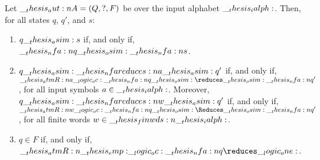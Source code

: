 \begin{theorem}
  Let $\__thesis_aut:n {A} = (Q, ?, F)$ be  over the input alphabet $\__thesis_ialph:$.
  Then, for all states $q$, $q'$, and $s$:
  \begin{enumerate}
  \item\label{enum:nfa-adequacy-1} $q \__thesis_asim: s$ if, and only if, $\__thesis_nfa:n {q} \__thesis_osim: \__thesis_nfa:n {s}$.
  \item\label{enum:nfa-adequacy-2} $q \asim\nfareduces[a]\asim q'$ if, and only if, $\atmR{a} \oc \nfa{q} \osim\reduces\osim \nfa{q}'$, for all input symbols $a \in \__thesis_ialph:$.
    Moreover, $q \asim\nfareduces[w]\asim q'$ if, and only if, $\atmR{w} \oc \nfa{q} \osim\Reduces\osim \nfa{q}'$, for all finite words $w \in \__thesis_finwds:n {\__thesis_ialph:}$.
  \item\label{enum:nfa-adequacy-3} $q \in F$ if, and only if, $\atmR{\emp} \oc \nfa{q} \reduces \one$.
  \end{enumerate}
\end{theorem}
%
